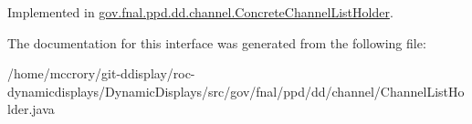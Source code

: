 Implemented in \hyperlink{classgov_1_1fnal_1_1ppd_1_1dd_1_1channel_1_1ConcreteChannelListHolder_a54e97b13a69c73cb973a184fa67c7175}{gov.\-fnal.\-ppd.\-dd.\-channel.\-Concrete\-Channel\-List\-Holder}.



The documentation for this interface was generated from the following file\-:\begin{DoxyCompactItemize}
\item 
/home/mccrory/git-\/ddisplay/roc-\/dynamicdisplays/\-Dynamic\-Displays/src/gov/fnal/ppd/dd/channel/Channel\-List\-Holder.\-java\end{DoxyCompactItemize}
